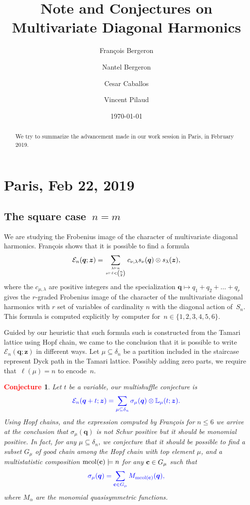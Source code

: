 \documentclass[12pt]{amsart}
\date{\today}
\author{Fran\c{c}ois Bergeron}
\author{Nantel Bergeron}\address[Bergeron]
\author{Cesar Caballos}
\author{Vincent Pilaud}
\title[Note and Conjectures on Multivariate Diagonal Harmonics]{Note and Conjectures on \\ Multivariate Diagonal Harmonics}
\newcommand{\blue}[1]{\textcolor{blue}{#1}}
\newcommand{\red}[1]{\textcolor{red}{#1}}
\theoremstyle{plain}
\newtheorem{conjecture}{\red{Conjecture}}
\theoremstyle{definition}
\theoremstyle{remark}
\newcommand{\Qvar}{{\bm q}}
\newcommand{\Zvar}{{\bm z}}
\begin{document}
\begin{abstract}
We try to summarize the advancement made in our work session in Paris, in February 2019.
\end{abstract}

\maketitle

\section{Paris, Feb 22, 2019}

\subsection{The square case~$n = m$}
We are studying the Frobenius image of the character of multivariate diagonal harmonics. Fran\c{c}ois shows that it is possible to find a formula
{\begin{equation}\label{eq:En}
{\mathcal E}_n(\Qvar;\Zvar) = \sum_{\lambda \vdash n \atop \nu \vdash \ell<{n\choose 2}} c_{\nu,\lambda} s_\nu(\Qvar) \otimes s_\lambda(\Zvar),
\end{equation}}
where the $c_{\mu,\lambda}$ are positive integers and the specialization $\Qvar \mapsto q_1 + q_2 + \dots + q_r$ gives the $r$-graded Frobenius image of the character of the multivariate diagonal harmonics with $r$ set of variables of cardinality $n$ with the diagonal action of~$S_n$.
This formula is computed explicitly by computer for~$n \in \{1,2,3,4,5,6\}$.

Guided by our heuristic that such formula such is constructed from the Tamari lattice using Hopf chain, we came to the conclusion that it is possible to write~${\mathcal E}_n(\Qvar;\Zvar)$ in different ways.
Let $\mu\subseteq\delta_n$ be a partition included in the staircase represent Dyck path in the Tamari lattice.
Possibly adding zero parts, we require that~$\ell(\mu) = n$ to encode~$n$.

\begin{conjecture}\label{conj:master}
Let $t$ be a variable, our multishuffle conjecture is
\begin{equation}\label{eq:multishuff}
\blue{
{\mathcal E}_n(\Qvar+t;\Zvar) = \sum_{\mu\subseteq\delta_n} \sigma_{\mu}(\Qvar) \otimes {\mathbb L}_{\mu}(t;\Zvar).
}
\end{equation}
Using Hopf chains, and the expression computed by Fran\c{c}ois for $n\le 6$ we arrive at the conclusion that $\sigma_{\mu}(\Qvar)$ is not Schur positive but it should be monomial positive.
In fact, for any $\mu\subseteq\delta_n$, we conjecture that it should be possible to find a subset $G_\mu$ of good chain among the Hopf chain with top element $\mu$, and a multistatistic composition ${\mathrm{mcol}}({\bf c})\models n$ for any ${\bf c}\in G_\mu$ such that
\begin{equation}\label{eq:chainstat}
\blue{
\sigma_\mu(\Qvar) = \sum_{{\bf c} \in G_\mu} M_{{\mathrm{mcol}}({\bf c})}(\Qvar),
}
\end{equation}
where $M_\alpha$ are the monomial quasisymmetric functions.
\end{conjecture}
\end{document}
